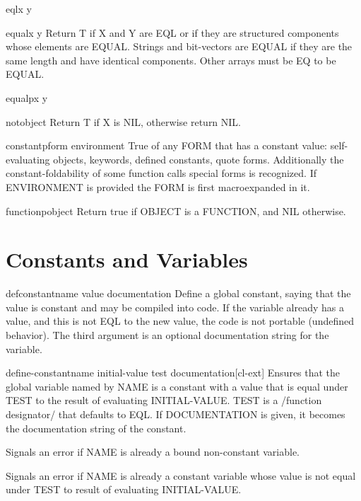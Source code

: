 \documentclass[10pt,english]{book}
\begin{document}
\begin{function}{eql}{x y}
  
\end{function}

\begin{function}{equal}{x y}
  Return T if X and Y are EQL or if they are structured components whose
elements are EQUAL. Strings and bit-vectors are EQUAL if they are the same
length and have identical components. Other arrays must be EQ to be EQUAL.
\end{function}

\begin{function}{equalp}{x y}
  
\end{function}

\begin{function}{not}{object}
  Return T if X is NIL, otherwise return NIL.
\end{function}

\begin{function}{constantp}{form \op environment}
  True of any FORM that has a constant value: self-evaluating objects,
keywords, defined constants, quote forms. Additionally the
constant-foldability of some function calls special forms is recognized. If
ENVIRONMENT is provided the FORM is first macroexpanded in it.
\end{function}

\begin{function}{functionp}{object}
  Return true if OBJECT is a FUNCTION, and NIL otherwise.
\end{function}

\section{Constants and Variables}
\label{sec:constants-variables}

\begin{macro}{defconstant}{name value \op documentation}
  Define a global constant, saying that the value is constant and may be
  compiled into code. If the variable already has a value, and this is not
  EQL to the new value, the code is not portable (undefined behavior). The
  third argument is an optional documentation string for the variable.
\end{macro}

\begin{macro}{define-constant}{name initial-value \key test documentation}[cl-ext]
  Ensures that the global variable named by NAME is a constant with a value
that is equal under TEST to the result of evaluating INITIAL-VALUE. TEST is a
/function designator/ that defaults to EQL. If DOCUMENTATION is given, it
becomes the documentation string of the constant.

Signals an error if NAME is already a bound non-constant variable.

Signals an error if NAME is already a constant variable whose value is not
equal under TEST to result of evaluating INITIAL-VALUE.
\end{macro}
\end{document}
